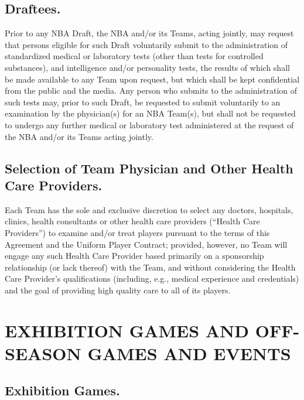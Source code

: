 \documentclass[
]{book}
\begin{document}
\hypertarget{draftees.}{%
\section{Draftees.}\label{draftees.}}

Prior to any NBA Draft, the NBA and/or its Teams, acting jointly, may request that persons eligible for such Draft voluntarily submit to the administration of standardized medical or laboratory tests (other than tests for controlled substances), and intelligence and/or personality tests, the results of which shall be made available to any Team upon request, but which shall be kept confidential from the public and the media. Any person who submits to the administration of such tests may, prior to such Draft, be requested to submit voluntarily to an examination by the physician(s) for an NBA Team(s), but shall not be requested to undergo any further medical or laboratory test administered at the request of the NBA and/or its Teams acting jointly.

\hypertarget{selection-of-team-physician-and-other-health-care-providers.}{%
\section{Selection of Team Physician and Other Health Care Providers.}\label{selection-of-team-physician-and-other-health-care-providers.}}

Each Team has the sole and exclusive discretion to select any doctors, hospitals, clinics, health consultants or other health care providers (``Health Care Providers'') to examine and/or treat players pursuant to the terms of this Agreement and the Uniform Player Contract; provided, however, no Team will engage any such Health Care Provider based primarily on a sponsorship relationship (or lack thereof) with the Team, and without considering the Health Care Provider's qualifications (including, e.g., medical experience and credentials) and the goal of providing high quality care to all of its players.

\hypertarget{exhibition-games-and-off-season-games-and-events}{%
\chapter{EXHIBITION GAMES AND OFF-SEASON GAMES AND EVENTS}\label{exhibition-games-and-off-season-games-and-events}}


\hypertarget{exhibition-games.-1}{%
\section{Exhibition Games.}\label{exhibition-games.-1}}
\end{document}
